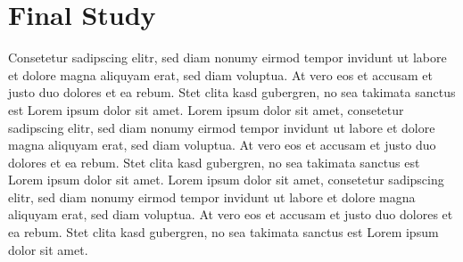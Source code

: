 \section{Final Study}
Consetetur sadipscing elitr,  sed diam nonumy eirmod tempor invidunt ut labore
et dolore magna aliquyam erat, sed diam voluptua. At vero eos et accusam et
justo duo dolores et ea rebum. Stet clita kasd gubergren, no sea takimata
sanctus est Lorem ipsum dolor sit amet. Lorem ipsum dolor sit amet, consetetur
sadipscing elitr,  sed diam nonumy eirmod tempor invidunt ut labore et dolore
magna aliquyam erat, sed diam voluptua. At vero eos et accusam et justo duo
dolores et ea rebum. Stet clita kasd gubergren, no sea takimata sanctus est
Lorem ipsum dolor sit amet. Lorem ipsum dolor sit amet, consetetur sadipscing
elitr,  sed diam nonumy eirmod tempor invidunt ut labore et dolore magna
aliquyam erat, sed diam voluptua. At vero eos et accusam et justo duo dolores
et ea rebum. Stet clita kasd gubergren, no sea takimata sanctus est Lorem ipsum
dolor sit amet.
